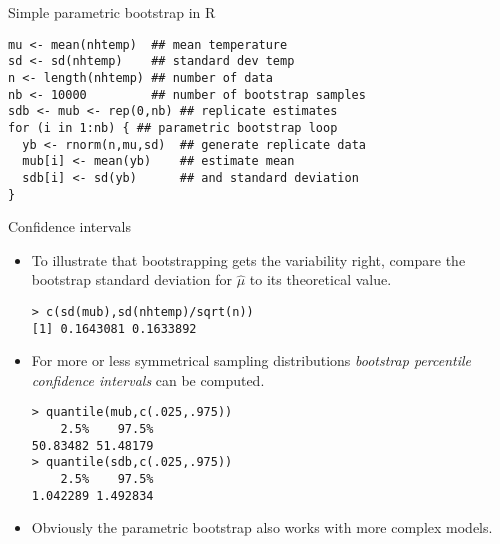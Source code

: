 \documentclass{beamer}
\newcommand{\eps}[3]
{{\begin{center}
 \rotatebox{#1}{\scalebox{#2}{\texttt{[image: \#3]}}}
 \end{center}}
}
\begin{document}
\begin{frame}[fragile]{Simple parametric bootstrap in R}

{\small \begin{verbatim}
mu <- mean(nhtemp)  ## mean temperature
sd <- sd(nhtemp)    ## standard dev temp
n <- length(nhtemp) ## number of data 
nb <- 10000         ## number of bootstrap samples
sdb <- mub <- rep(0,nb) ## replicate estimates
for (i in 1:nb) { ## parametric bootstrap loop
  yb <- rnorm(n,mu,sd)  ## generate replicate data
  mub[i] <- mean(yb)    ## estimate mean
  sdb[i] <- sd(yb)      ## and standard deviation
}
\end{verbatim}}
\eps{-90}{.45}{nht-para-bs.eps}

\end{frame}

\begin{frame}[fragile]{Confidence intervals}
\begin{itemize}
\item To illustrate that bootstrapping gets the variability right, compare the bootstrap standard deviation for $\hat \mu$ to its theoretical value.
{\small \begin{verbatim}
> c(sd(mub),sd(nhtemp)/sqrt(n))
[1] 0.1643081 0.1633892
\end{verbatim}}
\item For more or less symmetrical sampling distributions {\em bootstrap percentile confidence intervals} can be computed.
{\small \begin{verbatim}
> quantile(mub,c(.025,.975))
    2.5%    97.5% 
50.83482 51.48179 
> quantile(sdb,c(.025,.975))
    2.5%    97.5% 
1.042289 1.492834
\end{verbatim}}
\item Obviously the parametric bootstrap also works with more complex models.
\end{itemize}
\end{frame}
\end{document}
